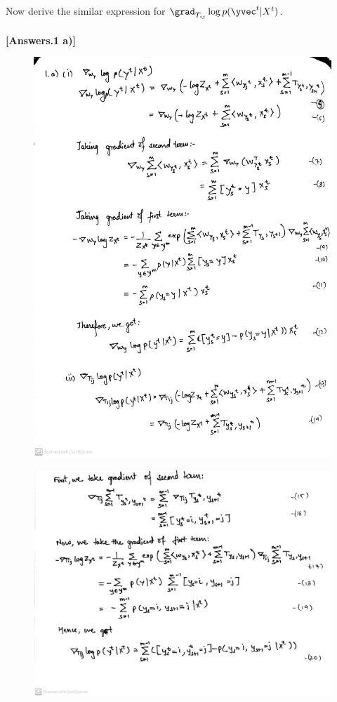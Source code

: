 \documentclass[11pt]{report}
\begin{document}
\begin{itemize}
	Now derive the similar expression for $\grad_{T_{ij}} \log p(\yvec^t|X^t)$.
	\\ \\
	{\bf [Answers.1 a)]} 
	\begin{figure}[H]
    \includegraphics[width=16cm]{Figures/1a.jpeg}
    \centering
    \end{figure}
    \begin{figure}[H]
    \includegraphics[width=13cm]{Figures/1aa.jpeg}
    \centering
    \end{figure}
	

\end{itemize}
\end{document}
